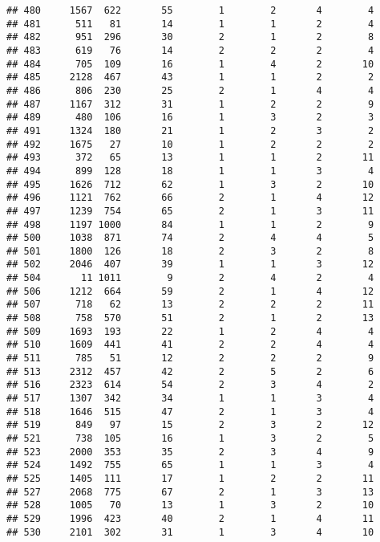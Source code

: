 \documentclass[]{article}
\begin{document}
\begin{verbatim}
## 480     1567  622       55        1        2       4        4
## 481      511   81       14        1        1       2        4
## 482      951  296       30        2        1       2        8
## 483      619   76       14        2        2       2        4
## 484      705  109       16        1        4       2       10
## 485     2128  467       43        1        1       2        2
## 486      806  230       25        2        1       4        4
## 487     1167  312       31        1        2       2        9
## 489      480  106       16        1        3       2        3
## 491     1324  180       21        1        2       3        2
## 492     1675   27       10        1        2       2        2
## 493      372   65       13        1        1       2       11
## 494      899  128       18        1        1       3        4
## 495     1626  712       62        1        3       2       10
## 496     1121  762       66        2        1       4       12
## 497     1239  754       65        2        1       3       11
## 498     1197 1000       84        1        1       2        9
## 500     1038  871       74        2        4       4        5
## 501     1800  126       18        2        3       2        8
## 502     2046  407       39        1        1       3       12
## 504       11 1011        9        2        4       2        4
## 506     1212  664       59        2        1       4       12
## 507      718   62       13        2        2       2       11
## 508      758  570       51        2        1       2       13
## 509     1693  193       22        1        2       4        4
## 510     1609  441       41        2        2       4        4
## 511      785   51       12        2        2       2        9
## 513     2312  457       42        2        5       2        6
## 516     2323  614       54        2        3       4        2
## 517     1307  342       34        1        1       3        4
## 518     1646  515       47        2        1       3        4
## 519      849   97       15        2        3       2       12
## 521      738  105       16        1        3       2        5
## 523     2000  353       35        2        3       4        9
## 524     1492  755       65        1        1       3        4
## 525     1405  111       17        1        2       2       11
## 527     2068  775       67        2        1       3       13
## 528     1005   70       13        1        3       2       10
## 529     1996  423       40        2        1       4       11
## 530     2101  302       31        1        3       4       10

\end{verbatim}
\end{document}
